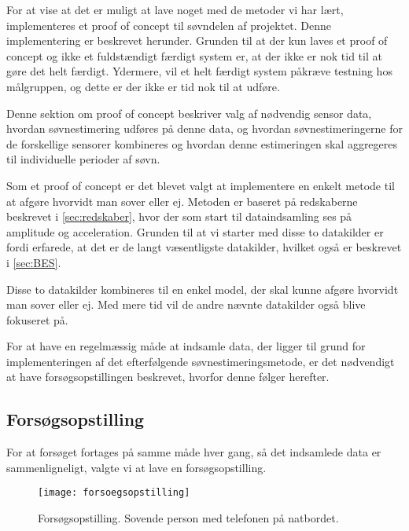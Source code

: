 For at vise at det er muligt at lave noget med de metoder vi har lært, implementeres et proof of concept til søvndelen af projektet. 
Denne implementering er beskrevet herunder.
Grunden til at der kun laves et proof of concept og ikke et fuldstændigt færdigt system er, at der ikke er nok tid til at gøre det helt færdigt. 
Ydermere, vil et helt færdigt system påkræve testning hos målgruppen, og dette er der ikke er tid nok til at udføre. 

Denne sektion om proof of concept beskriver valg af nødvendig sensor data, hvordan søvnestimering udføres på denne data, og hvordan søvnestimeringerne for de forskellige sensorer kombineres og hvordan denne estimeringen skal aggregeres til individuelle perioder af søvn.


Som et proof of concept er det blevet valgt at implementere en enkelt metode til at afgøre hvorvidt man sover eller ej.
Metoden er baseret på redskaberne beskrevet i \cref{sec:redskaber}, hvor der som start til dataindsamling ses på amplitude og acceleration.
Grunden til at vi starter med disse to datakilder er fordi \citet{6563918} erfarede, at det er de langt væsentligste datakilder, hvilket også er beskrevet i \cref{sec:BES}.

Disse to datakilder kombineres til en enkel model, der skal kunne afgøre hvorvidt man sover eller ej.
Med mere tid vil de andre nævnte datakilder også blive fokuseret på.

For at have en regelmæssig måde at indsamle data, der ligger til grund for implementeringen af det efterfølgende søvnestimeringsmetode, er det nødvendigt at have forsøgsopstillingen beskrevet, hvorfor denne følger herefter.
\subsection{Forsøgsopstilling}
For at forsøget fortages på samme måde hver gang, så det indsamlede data er sammenligneligt, valgte vi at lave en forsøgsopstilling.
\begin{figure}[h]
	\centering
	\texttt{[image: forsoegsopstilling]}
	\caption{Forsøgsopstilling. Sovende person med telefonen på natbordet.}
	\label{fig:forsoegopstillings}
\end{figure}

